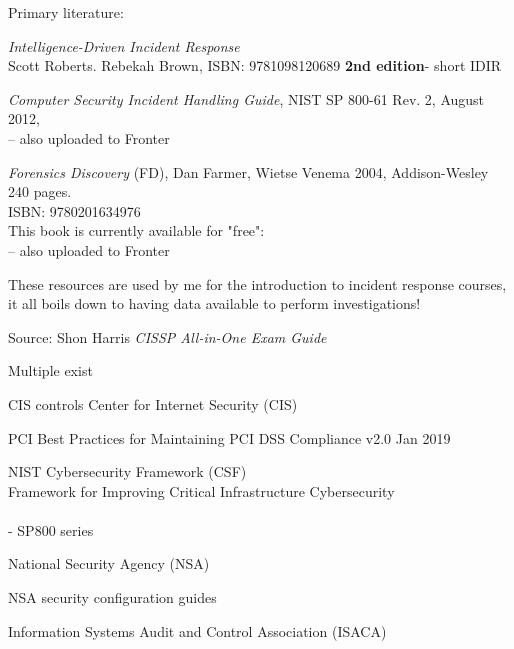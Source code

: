 \documentclass[Screen16to9,17pt]{foils}
\begin{document}

Primary literature:
\begin{list2}
\item \emph{Intelligence-Driven Incident Response} \\
 Scott Roberts. Rebekah Brown, ISBN: 9781098120689 {\bf 2nd edition}- short IDIR
\item \emph{Computer Security Incident Handling Guide}, NIST SP 800-61 Rev. 2, August 2012,\\
 -- also uploaded to Fronter
\item \emph{Forensics Discovery} (FD), Dan Farmer, Wietse Venema 2004, Addison-Wesley 240 pages.\\
ISBN: 9780201634976\\
This book is currently available for "free":\\
 -- also uploaded to Fronter
\end{list2}

These resources are used by me for the introduction to incident response courses, it all boils down to having data available to perform investigations!




Source: Shon Harris \emph{CISSP All-in-One Exam Guide}




\begin{list1}
\item Multiple exist
\vskip 1cm
\begin{list2}
\item CIS controls Center for Internet Security (CIS) 
\item PCI Best Practices for Maintaining PCI DSS Compliance v2.0 Jan 2019
\item NIST Cybersecurity Framework (CSF)\\
Framework for Improving
Critical Infrastructure Cybersecurity\\ \\
 - SP800 series
\item National Security Agency (NSA)\\
\item NSA security configuration guides\\
\item Information Systems Audit and Control Association (ISACA)\\
\end{list2}
\end{list1}
\end{document}
